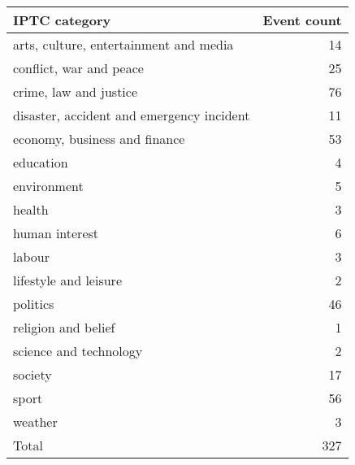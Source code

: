 \begin{tabular}{lr}
\hline
                             IPTC category &  Event count \\
\hline
    arts, culture, entertainment and media &           14 \\
                   conflict, war and peace &           25 \\
                    crime, law and justice &           76 \\
 disaster, accident and emergency incident &           11 \\
             economy, business and finance &           53 \\
                                 education &            4 \\
                               environment &            5 \\
                                    health &            3 \\
                            human interest &            6 \\
                                    labour &            3 \\
                     lifestyle and leisure &            2 \\
                                  politics &           46 \\
                       religion and belief &            1 \\
                    science and technology &            2 \\
                                   society &           17 \\
                                     sport &           56 \\
                                   weather &            3 \\
\hline
                                     Total &          327 \\
\hline
\end{tabular}
